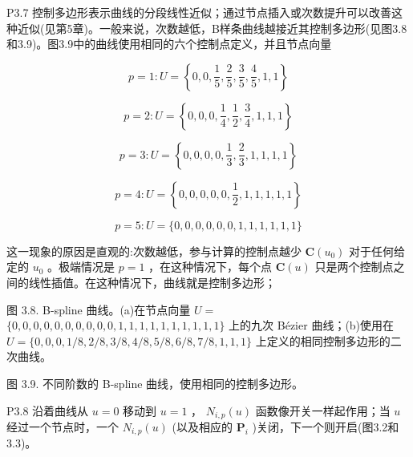 \documentclass[../main.tex]{subfiles}
\begin{document}
P3.7 控制多边形表示曲线的分段线性近似；通过节点插入或次数提升可以改善这种近似(见第5章)。一般来说，次数越低，B样条曲线越接近其控制多边形(见图3.8和3.9)。图3.9中的曲线使用相同的六个控制点定义，并且节点向量

\[
p = 1 : U = \left\{  {0,0,\frac{1}{5},\frac{2}{5},\frac{3}{5},\frac{4}{5},1,1}\right\}
\]

\[
p = 2 : U = \left\{  {0,0,0,\frac{1}{4},\frac{1}{2},\frac{3}{4},1,1,1}\right\}
\]

\[
p = 3 : U = \left\{  {0,0,0,0,\frac{1}{3},\frac{2}{3},1,1,1,1}\right\}
\]

\[
p = 4 : U = \left\{  {0,0,0,0,0,\frac{1}{2},1,1,1,1,1}\right\}
\]

\[
p = 5 : U = \{ 0,0,0,0,0,0,1,1,1,1,1,1\}
\]



这一现象的原因是直观的:次数越低，参与计算的控制点越少 \(\mathbf{C}\left( {u}_{0}\right)\) 对于任何给定的 \({u}_{0}\) 。极端情况是 \(p = 1\) ，在这种情况下，每个点 \(\mathbf{C}\left( u\right)\) 只是两个控制点之间的线性插值。在这种情况下，曲线就是控制多边形；

\begin{center}
\begin{minipage}{17cm}
\vspace*{.6\baselineskip}
\centering
{}
\par\smallskip
图 3.8. B-spline 曲线。(a)在节点向量 \(U =\)  \(\{ 0,0,0,0,0,0,0,0,0,0,1,1,1,1,1,1,1,1,1,1\}\) 上的九次 Bézier 曲线；(b)使用在 \(U = \{ 0,0,0,1/8,2/8,3/8,4/8,5/8,6/8,7/8,1,1,1\}\) 上定义的相同控制多边形的二次曲线。
\end{minipage}
\end{center}

\begin{center}
\begin{minipage}{16cm}
\vspace*{.6\baselineskip}
\centering
{}
\par\smallskip
图 3.9. 不同阶数的 B-spline 曲线，使用相同的控制多边形。
\end{minipage}
\end{center}

P3.8 沿着曲线从 \(u = 0\) 移动到 \(u = 1\) ， \({N}_{i,p}\left( u\right)\) 函数像开关一样起作用；当 \(u\) 经过一个节点时，一个 \({N}_{i,p}\left( u\right)\) (以及相应的 \({\mathbf{P}}_{i}\) )关闭，下一个则开启(图3.2和3.3)。
\end{document}
